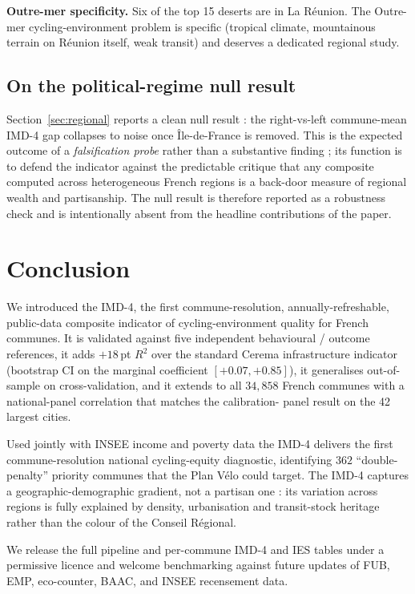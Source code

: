 \documentclass[11pt,a4paper]{article}
\begin{document}
\textbf{Outre-mer specificity.}  Six of the top 15 deserts are in
La R\'eunion.  The Outre-mer cycling-environment problem is
specific (tropical climate, mountainous terrain on R\'eunion
itself, weak transit) and deserves a dedicated regional study.

\subsection{On the political-regime null result}

Section~\ref{sec:regional} reports a clean null result : the
right-vs-left commune-mean IMD-4 gap collapses to noise once
\^Ile-de-France is removed.  This is the expected outcome of a
\emph{falsification probe} rather than a substantive finding ;
its function is to defend the indicator against the
predictable critique that any composite computed across
heterogeneous French regions is a back-door measure of regional
wealth and partisanship.  The null result is therefore reported
as a robustness check and is intentionally absent from the
headline contributions of the paper.

\section{Conclusion}
\label{sec:conclusion}

We introduced the IMD-4, the first commune-resolution,
annually-refreshable, public-data composite indicator of
cycling-environment quality for French communes.  It is validated
against five independent behavioural / outcome references, it
adds $+18\,$pt $R^2$ over the standard Cerema infrastructure
indicator (bootstrap CI on the marginal coefficient
$[+0.07, +0.85]$), it generalises out-of-sample on
cross-validation, and it extends to all $34{,}858$ French communes
with a national-panel correlation that matches the calibration-
panel result on the 42 largest cities.

Used jointly with INSEE income and poverty data the IMD-4
delivers the first commune-resolution national cycling-equity
diagnostic, identifying $362$ ``double-penalty'' priority communes
that the Plan V\'elo could target.  The IMD-4 captures a
geographic-demographic gradient, not a partisan one : its variation
across regions is fully explained by density, urbanisation and
transit-stock heritage rather than the colour of the Conseil
R\'egional.

We release the full pipeline and per-commune IMD-4 and IES
tables under a permissive licence and welcome benchmarking against
future updates of FUB, EMP, eco-counter, BAAC, and INSEE recensement
data.
\end{document}
